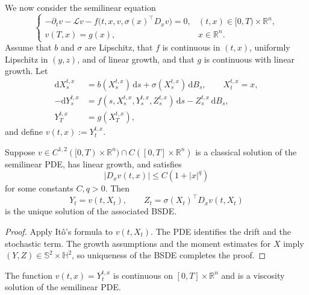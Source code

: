 We now consider the semilinear equation
\[
\begin{cases}
  -\partial_tv-\mathcal Lv
  -f\bigl(t,x,v,\sigma(x)^\top D_xv\bigr)=0,
    &(t,x)\in[0,T)\times\mathbb R^n,\\
  v(T,x)=g(x),&x\in\mathbb R^n.
\end{cases}
\]
Assume that $b$ and $\sigma$ are Lipschitz, that $f$ is continuous in
$(t,x)$, uniformly Lipschitz in $(y,z)$, and of linear growth, and that
$g$ is continuous with linear growth.  Let
\[
\begin{aligned}
  \mathrm dX_s^{t,x}
  &=b(X_s^{t,x})\,\mathrm ds
    +\sigma(X_s^{t,x})\,\mathrm dB_s,
  \qquad X_t^{t,x}=x,\\
  -\mathrm dY_s^{t,x}
  &=f(s,X_s^{t,x},Y_s^{t,x},Z_s^{t,x})\,\mathrm ds
    -Z_s^{t,x}\,\mathrm dB_s,\\
  Y_T^{t,x}&=g(X_T^{t,x}),
\end{aligned}
\]
and define $v(t,x):=Y_t^{t,x}$.

\begin{prop}
Suppose
$v\in C^{1,2}([0,T)\times\mathbb R^n)
\cap C([0,T]\times\mathbb R^n)$ is a classical solution of the
semilinear PDE, has linear growth, and satisfies
\[
  |D_xv(t,x)|\le C(1+|x|^q)
\]
for some constants $C,q>0$.  Then
\[
  Y_t=v(t,X_t),
  \qquad
  Z_t=\sigma(X_t)^\top D_xv(t,X_t)
\]
is the unique solution of the associated BSDE\@.
\end{prop}

\begin{proof}
Apply It\^o's formula to $v(t,X_t)$.  The PDE identifies the drift and
the stochastic term.  The growth assumptions and the moment estimates
for $X$ imply
$(Y,Z)\in\mathbb S^2\times\mathbb H^2$, so uniqueness of the BSDE
completes the proof.
\end{proof}

\begin{prop}
The function $v(t,x)=Y_t^{t,x}$ is continuous on
$[0,T]\times\mathbb R^n$ and is a viscosity solution of the semilinear
PDE\@.
\end{prop}

